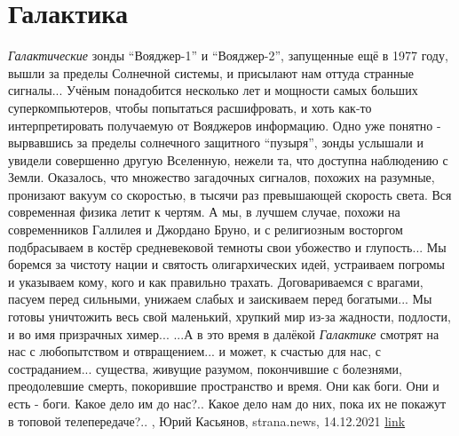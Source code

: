  
 
 
 
 
\chapter{Галактика}

\emph{Галактические} зонды \enquote{Вояджер-1} и \enquote{Вояджер-2}, запущенные ещё в 1977 году,
вышли за пределы Солнечной системы, и присылают нам оттуда странные сигналы...
Учёным понадобится несколько лет и мощности самых больших суперкомпьютеров,
чтобы попытаться расшифровать, и хоть как-то интерпретировать получаемую от
Вояджеров информацию. Одно уже понятно - вырвавшись за пределы солнечного
защитного \enquote{пузыря}, зонды услышали и увидели совершенно другую Вселенную,
нежели та, что доступна наблюдению с Земли.  Оказалось, что множество
загадочных сигналов, похожих на разумные, пронизают вакуум со скоростью, в
тысячи раз превышающей скорость света. Вся современная физика летит к чертям. А
мы, в лучшем случае, похожи на современников Галлилея и Джордано Бруно, и с
религиозным восторгом подбрасываем в костёр средневековой темноты свои
убожество и глупость...  Мы боремся за чистоту нации и святость олигархических
идей, устраиваем погромы и указываем кому, кого и как правильно трахать.
Договариваемся с врагами, пасуем перед сильными, унижаем слабых и заискиваем
перед богатыми... Мы готовы уничтожить весь свой маленький, хрупкий мир из-за
жадности, подлости, и во имя призрачных химер...  ...А в это время в далёкой
\emph{Галактике} смотрят на нас с любопытством и отвращением... и может, к счастью для
нас, с состраданием... существа, живущие разумом, покончившие с болезнями,
преодолевшие смерть, покорившие пространство и время.  Они как боги. Они и есть
- боги. Какое дело им до нас?.. Какое дело нам до них, пока их не покажут в
топовой телепередаче?..
, 
Юрий Касьянов, strana.news, 14.12.2021
\href{https://strana.news/opinions/367041-my-boremsja-za-chistotu-natsii-i-svjatost-oliharkhicheskikh-idej.html}{link}
